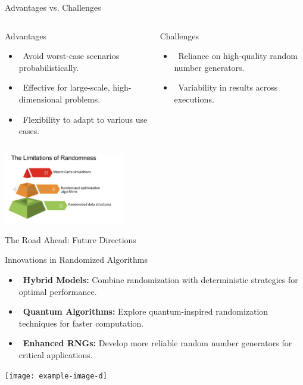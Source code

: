 \documentclass{beamer}
\begin{document}
\begin{frame}{Advantages vs. Challenges}
    \begin{columns}
        \begin{block}{Advantages}
            \begin{itemize}
                \item<1-> \faCheckCircle \ Avoid \alert{worst-case scenarios} probabilistically.
                \item<2-> \faChartBar \ Effective for \alert{large-scale, high-dimensional problems}.
                \item<3-> \faArrowsAlt \ Flexibility to adapt to \alert{various use cases}.
            \end{itemize}
        \end{block}
        \begin{exampleblock}{Challenges}
            \begin{itemize}
                \item<4-> \faExclamationTriangle \ Reliance on \alert{high-quality random number generators}.
                \item<5-> \faRandom \ Variability in \alert{results across executions}.
            \end{itemize}
        \end{exampleblock}
    \end{columns}
    \vfill
    \centering
    \includegraphics[width=0.4\textwidth]{challenge.png}
\end{frame}

\begin{frame}{The Road Ahead: Future Directions}
    \begin{block}{Innovations in Randomized Algorithms}
        \begin{itemize}
            \item<1-> \faCubes \ \textbf{Hybrid Models:} Combine randomization with deterministic strategies for optimal performance.
            \item<2-> \faAtom \ \textbf{Quantum Algorithms:} Explore quantum-inspired randomization techniques for faster computation.
            \item<3-> \faDice \ \textbf{Enhanced RNGs:} Develop more reliable random number generators for critical applications.
        \end{itemize}
    \end{block}
    \vspace{0.5cm}
    \centering
    \texttt{[image: example-image-d]}
\end{frame}
\end{document}

